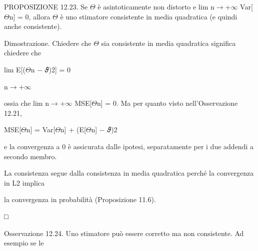 \documentclass[a4paper,portrait,12pt]{article}
\begin{document}
\begin{flushleft}
PROPOSIZIONE 12.23. Se $\Theta$ \`{e} asintoticamente non distorto e lim n$\rightarrow$+$\infty$ Var[$\Theta$n] = 0, allora $\Theta$ \`{e} uno stimatore consistente in media quadratica (e quindi anche consistente).
\end{flushleft}


\begin{flushleft}
Dimostrazione. Chiedere che $\Theta$ sia consistente in media quadratica significa chiedere che
\end{flushleft}


\begin{flushleft}
lim E[($\Theta$n $-$ 𝜗)2] = 0
\end{flushleft}





\begin{flushleft}
n$\rightarrow$+$\infty$
\end{flushleft}





\begin{flushleft}
ossia che lim n$\rightarrow$+$\infty$ MSE[$\Theta$n] = 0. Ma per quanto visto nell'Osservazione 12.21,
\end{flushleft}


\begin{flushleft}
MSE[$\Theta$n] = Var[$\Theta$n] + (E[$\Theta$n] $-$ 𝜗)2
\end{flushleft}


\begin{flushleft}
e la convergenza a 0 \`{e} assicurata dalle ipotesi, separatamente per i due addendi a secondo membro.
\end{flushleft}


\begin{flushleft}
La consistenza segue dalla consistenza in media quadratica perch\'{e} la convergenza in L2 implica
\end{flushleft}


\begin{flushleft}
la convergenza in probabilit\`{a} (Proposizione 11.6).
\end{flushleft}


□





\begin{flushleft}
Osservazione 12.24. Uno stimatore pu\`{o} essere corretto ma non consistente. Ad esempio se le
\end{flushleft}
\end{document}
